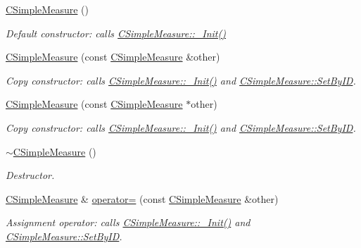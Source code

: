 \begin{DoxyCompactItemize}
\item 
\hyperlink{classCSimpleMeasure_ad59772618a763def710ef6e3a8fbcb9f}{C\+Simple\+Measure} ()
\begin{DoxyCompactList}\small\item\em Default constructor\+: calls \hyperlink{classCSimpleMeasure_ada8744ac5a824143904a2ecaef2b0b70}{C\+Simple\+Measure\+::\+\_\+\+Init()} \end{DoxyCompactList}\item 
\hyperlink{classCSimpleMeasure_a5dfc63fe4e75fb128991440c8b33b845}{C\+Simple\+Measure} (const \hyperlink{classCSimpleMeasure}{C\+Simple\+Measure} \&other)
\begin{DoxyCompactList}\small\item\em Copy constructor\+: calls \hyperlink{classCSimpleMeasure_ada8744ac5a824143904a2ecaef2b0b70}{C\+Simple\+Measure\+::\+\_\+\+Init()} and \hyperlink{classCSimpleMeasure_a6945aa333dca5623482d38cd9a7e3225}{C\+Simple\+Measure\+::\+Set\+By\+ID}. \end{DoxyCompactList}\item 
\hyperlink{classCSimpleMeasure_a0be2c11e276b999b8de941a5f94b0369}{C\+Simple\+Measure} (const \hyperlink{classCSimpleMeasure}{C\+Simple\+Measure} $\ast$other)
\begin{DoxyCompactList}\small\item\em Copy constructor\+: calls \hyperlink{classCSimpleMeasure_ada8744ac5a824143904a2ecaef2b0b70}{C\+Simple\+Measure\+::\+\_\+\+Init()} and \hyperlink{classCSimpleMeasure_a6945aa333dca5623482d38cd9a7e3225}{C\+Simple\+Measure\+::\+Set\+By\+ID}. \end{DoxyCompactList}\item 
\hyperlink{classCSimpleMeasure_a6a691614fc884c34c9f6ad36c670587b}{$\sim$\+C\+Simple\+Measure} ()
\begin{DoxyCompactList}\small\item\em Destructor. \end{DoxyCompactList}\item 
\hyperlink{classCSimpleMeasure}{C\+Simple\+Measure} \& \hyperlink{classCSimpleMeasure_a8466a492481648fa96a734566f0d6ba5}{operator=} (const \hyperlink{classCSimpleMeasure}{C\+Simple\+Measure} \&other)
\begin{DoxyCompactList}\small\item\em Assignment operator\+: calls \hyperlink{classCSimpleMeasure_ada8744ac5a824143904a2ecaef2b0b70}{C\+Simple\+Measure\+::\+\_\+\+Init()} and \hyperlink{classCSimpleMeasure_a6945aa333dca5623482d38cd9a7e3225}{C\+Simple\+Measure\+::\+Set\+By\+ID}. \end{DoxyCompactList}\item 

\end{DoxyCompactItemize}
